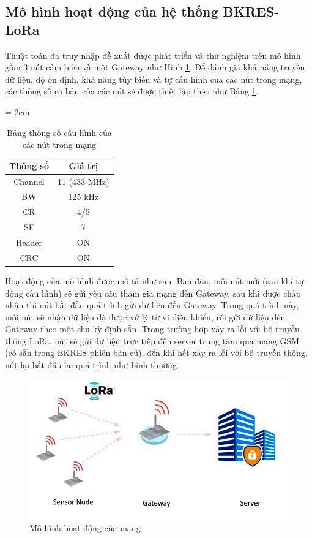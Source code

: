 \subsection{Mô hình hoạt động của hệ thống BKRES-LoRa}
Thuật toán đa truy nhập đề xuất được phát triển và thử nghiệm trên mô hình gồm 3 nút cảm biến và một Gateway như Hình \ref{normal}{}. Để đánh giá khả năng truyền dữ liệu, độ ổn định, khả năng tùy biến và tự cấu hình của các nút trong mạng, các thông số cơ bản của các nút sẽ được thiết lập theo như Bảng \ref{bang3_1}{}.
\begin{table}[h]
	\tabcolsep = 2cm
    \centering
    \caption{Bảng thông số cấu hình của các nút trong mạng}
    \begin{tabular}{|c|c|}
     	\hline
     	Thông số & Giá trị  \\
     	\hline
     	Channel & 11 (433 MHz)\\
     	\hline
     	BW & 125 kHz\\
     	\hline
     	CR & 4/5\\
     	\hline
     	SF & 7\\
     	\hline
     	Header & ON\\
     	\hline
     	CRC & ON\\
     	\hline
    \end{tabular}
    \label{bang3_1}
\end{table}
\par 
Hoạt động của mô hình được mô tả như sau. Ban đầu, mỗi nút mới (sau khi tự động cấu hình) sẽ gửi yêu cầu tham gia mạng đến Gateway, sau khi được chấp nhận thì nút bắt đầu quá trình gửi dữ liệu đến Gateway. Trong quá trình này, mỗi nút sẽ nhận dữ liệu đã được xử lý từ vi điều khiển, rồi gửi dữ liệu đến Gateway theo một chu kỳ định sẵn. Trong trường hợp xảy ra lỗi với bộ truyền thông LoRa, nút sẽ gửi dữ liệu trực tiếp đến server trung tâm qua mạng GSM (có sẵn trong BKRES phiên bản cũ), đến khi hết xảy ra lỗi với bộ truyền thông, nút lại bắt đầu lại quá trình như bình thường.\\
\begin{figure}[h]
	\centering
		\includegraphics[scale=0.4]{image/normal}
	\caption{Mô hình hoạt động của mạng}
	\label{normal}
\end{figure}
